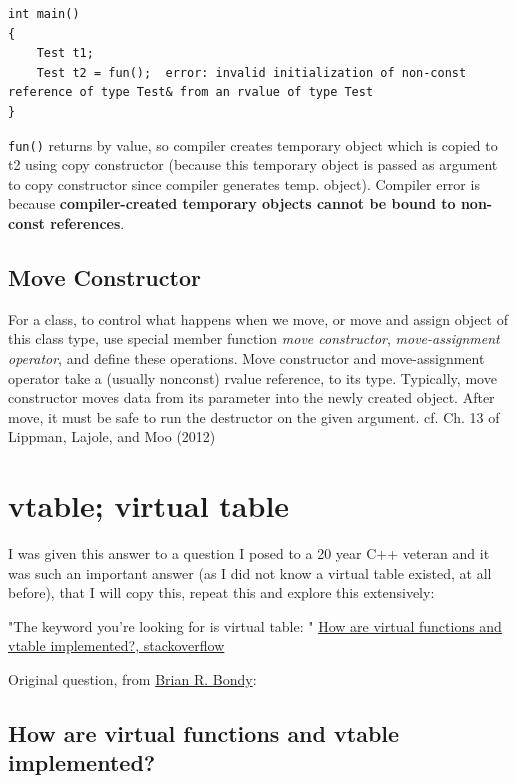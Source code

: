\documentclass[10pt]{amsart}
\begin{document}
\begin{multicols*}{2}
\begin{lstlisting}
int main()
{
	Test t1;
	Test t2 = fun();  error: invalid initialization of non-const reference of type Test& from an rvalue of type Test
}
\end{lstlisting}

\verb|fun()| returns by value, so compiler creates temporary object which is copied to t2 using copy constructor (because this temporary object is passed as argument to copy constructor since compiler generates temp. object).  
Compiler error is because \textbf{compiler-created temporary objects cannot be bound to non-const references}. 



\subsection{Move Constructor}  

For a class, to control what happens when we move, or move and assign object of this class type, use special member function \emph{move constructor}, \emph{move-assignment operator}, and define these operations.  Move constructor and move-assignment operator take a (usually nonconst) rvalue reference, to its type.  Typically, move constructor moves data from its parameter into the newly created object.  After move, it must be safe to run the destructor on the given argument.  cf. Ch. 13 of Lippman, Lajole, and Moo (2012) \cite{LLM2012}



\section{vtable; virtual table}  

I was given this answer to a question I posed to a 20 year C++ veteran and it was such an important answer (as I did not know a virtual table existed, at all before), that I will copy this, repeat this and explore this extensively:  

"The keyword you're looking for is virtual table: " \href{https://stackoverflow.com/questions/99297/how-are-virtual-functions-and-vtable-implemented}{How are virtual functions and vtable implemented?, stackoverflow}  

Original question, from \href{https://stackoverflow.com/users/3153/brian-r-bondy}{Brian R. Bondy}:  

\subsection{How are virtual functions and vtable implemented?}


\end{multicols*}
\end{document}
